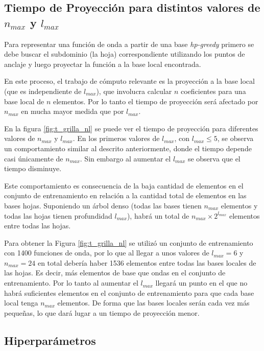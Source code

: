 \subsection{Tiempo de Proyección para distintos valores de $n_{max}$ y $l_{max}$}

Para representar una función de onda a partir de una base \textit{hp-greedy} primero se debe buscar el subdominio (la hoja) correspondiente utilizando los puntos de anclaje y luego proyectar la función a la base local encontrada. 

En este proceso, el trabajo de cómputo relevante es la proyección a la base local (que es independiente de $l_{max}$), que involucra calcular $n$ coeficientes para una base local de $n$ elementos. Por lo tanto el tiempo de proyección será afectado por $n_{max}$ en mucha mayor medida que por $l_{max}$. 

En la figura \ref{fig:t_grilla_nl} se puede ver el tiempo de proyección para diferentes valores de $n_{max}$ y $l_{max}$. En los primeros valores de $l_{max}$, con $l_{max} \leq 5$, se observa un comportamiento similar al descrito anteriormente, donde el tiempo depende casi únicamente de $n_{max}$. Sin embargo al aumentar el $l_{max}$ se observa que el tiempo disminuye. 


Este comportamiento es consecuencia de la baja cantidad de elementos en el conjunto de entrenamiento en relación a la cantidad total de elementos en las bases hojas. 
Suponiendo un árbol denso (todas las bases tienen $n_{max}$ elementos y todas las hojas tienen profundidad $l_{max}$), habrá un total de $n_{max} \times 2^{l_{max}}$ elementos entre todas las hojas. 

Para obtener la Figura \ref{fig:t_grilla_nl} se utilizó un conjunto de entrenamiento con 1400 funciones de onda, por lo que al llegar a unos valores de $l_{max} = 6$ y $n_{max} = 24$ en total debería haber 1536 elementos entre todas las bases locales de las hojas. Es decir, más elementos de base que ondas en el conjunto de entrenamiento. Por lo tanto al aumentar el $l_{max}$ llegará un punto en el que no habrá suficientes elementos en el conjunto de entrenamiento para que cada base local tenga $n_{max}$ elementos. De forma que las bases locales serán cada vez más pequeñas, lo que dará lugar a un tiempo de proyección menor.



\subsection{Hiperparámetros}

